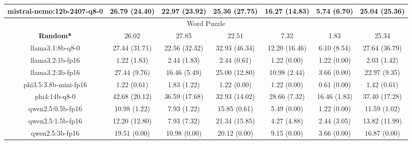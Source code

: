 \begin{table}[hbp]
{\begin{tabular}{ccccccc}
        \multicolumn{1}{c|}{mistral-nemo:12b-2407-q8-0} & 26.79 (24.40) & 22.97 (23.92) & \multicolumn{1}{c|}{25.36 (27.75)} & 16.27 (14.83) & \multicolumn{1}{c|}{5.74 (6.70)} & 25.04 (25.36) \\
        
\hline
\multicolumn{7}{c}{Word Puzzle} \\ \hline
\multicolumn{1}{c|}{\textbf{Random*}} & 26.02 & 27.85 & \multicolumn{1}{c|}{22.51} & 7.32 & \multicolumn{1}{c|}{1.83} & 25.34 \\ \hline

        \multicolumn{1}{c|}{llama3.1:8b-q8-0} & 27.44 (31.71) & 22.56 (32.32) & \multicolumn{1}{c|}{32.93 (46.34)} & 12.20 (16.46) & \multicolumn{1}{c|}{6.10 (8.54)} & 27.64 (36.79) \\
        

        \multicolumn{1}{c|}{llama3.2:1b-fp16} & 1.22 (1.83) & 2.44 (1.83) & \multicolumn{1}{c|}{2.44 (0.61)} & 1.22 (0.00) & \multicolumn{1}{c|}{1.22 (0.00)} & 2.03 (1.42) \\
        

        \multicolumn{1}{c|}{llama3.2:3b-fp16} & 27.44 (9.76) & 16.46 (5.49) & \multicolumn{1}{c|}{25.00 (12.80)} & 10.98 (2.44) & \multicolumn{1}{c|}{3.66 (0.00)} & 22.97 (9.35) \\
        

        \multicolumn{1}{c|}{phi3.5:3.8b-mini-fp16} & 1.22 (0.61) & 1.83 (1.22) & \multicolumn{1}{c|}{1.22 (0.00)} & 1.22 (0.00) & \multicolumn{1}{c|}{0.61 (0.00)} & 1.42 (0.61) \\
        

        \multicolumn{1}{c|}{phi4:14b-q8-0} & 42.68 (20.12) & 36.59 (17.68) & \multicolumn{1}{c|}{32.93 (14.02)} & 28.66 (7.32) & \multicolumn{1}{c|}{16.46 (1.83)} & 37.40 (17.28) \\
        

        \multicolumn{1}{c|}{qwen2.5:0.5b-fp16} & 10.98 (1.22) & 7.93 (1.22) & \multicolumn{1}{c|}{15.85 (0.61)} & 5.49 (0.00) & \multicolumn{1}{c|}{1.22 (0.00)} & 11.59 (1.02) \\
        

        \multicolumn{1}{c|}{qwen2.5:1.5b-fp16} & 12.20 (12.80) & 7.93 (7.32) & \multicolumn{1}{c|}{21.34 (15.85)} & 4.27 (4.88) & \multicolumn{1}{c|}{2.44 (3.05)} & 13.82 (11.99) \\
        

        \multicolumn{1}{c|}{qwen2.5:3b-fp16} & 19.51 (0.00) & 10.98 (0.00) & \multicolumn{1}{c|}{20.12 (0.00)} & 9.15 (0.00) & \multicolumn{1}{c|}{3.66 (0.00)} & 16.87 (0.00) \\
        


\end{tabular}}
\end{table}
